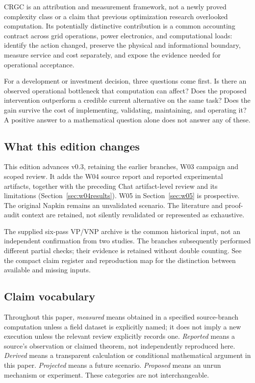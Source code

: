\documentclass[11pt,letterpaper]{article}
\begin{document}
CRGC is an attribution and measurement framework, not a newly proved complexity class or a claim that previous optimization research overlooked computation. Its potentially distinctive contribution is a common accounting contract across grid operations, power electronics, and computational loads: identify the action changed, preserve the physical and informational boundary, measure service and cost separately, and expose the evidence needed for operational acceptance.

For a development or investment decision, three questions come first. Is there an observed operational bottleneck that computation can affect? Does the proposed intervention outperform a credible current alternative on the same task? Does the gain survive the cost of implementing, validating, maintaining, and operating it? A positive answer to a mathematical question alone does not answer any of these.

\subsection{What this edition changes}
This edition advances v0.3, retaining the earlier branches, W03 campaign and scoped review. It adds the W04 source report and reported experimental artifacts, together with the preceding Chat artifact-level review and its limitations (Section~\ref{sec:w04results}). W05 in Section~\ref{sec:w05} is prospective. The original Napkin remains an unvalidated scenario. The literature and proof-audit context are retained, not silently revalidated or represented as exhaustive.\cite{chatbranch,workbranch,w03packet,w03review,w04packet}

The supplied six-pass VP/VNP archive is the common historical input, not an independent confirmation from two studies. The branches subsequently performed different partial checks; their evidence is retained without double counting. See the compact claim register and reproduction map for the distinction between available and missing inputs.

\subsection{Claim vocabulary}
Throughout this paper, \emph{measured} means obtained in a specified source-branch computation unless a field dataset is explicitly named; it does not imply a new execution unless the relevant review explicitly records one. \emph{Reported} means a source's observation or claimed theorem, not independently reproduced here. \emph{Derived} means a transparent calculation or conditional mathematical argument in this paper. \emph{Projected} means a future scenario. \emph{Proposed} means an unrun mechanism or experiment. These categories are not interchangeable.
\end{document}
